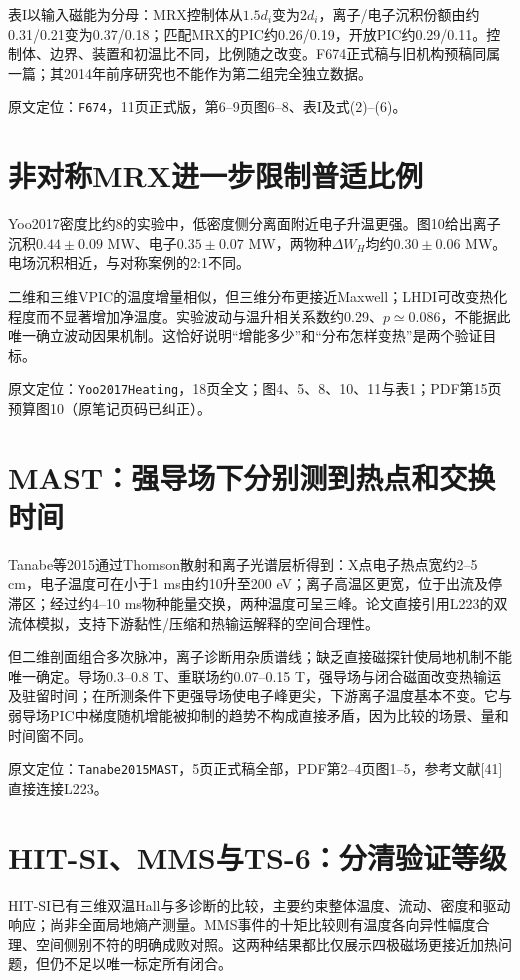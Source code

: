 \documentclass[UTF8,a4paper,11pt,openany,fontset=fandol]{ctexbook}
\newcommand{\loc}[2]{\par\noindent\textsf{原文定位：}\texttt{#1}，#2。\par}
\begin{document}
表I以输入磁能为分母：MRX控制体从$1.5d_i$变为$2d_i$，离子/电子沉积份额由约0.31/0.21变为0.37/0.18；匹配MRX的PIC约0.26/0.19，开放PIC约0.29/0.11。控制体、边界、装置和初温比不同，比例随之改变。F674正式稿与旧机构预稿同属一篇；其2014年前序研究也不能作为第二组完全独立数据。
\loc{F674}{11页正式版，第6--9页图6--8、表I及式(2)--(6)}

\section{非对称MRX进一步限制普适比例}
Yoo2017密度比约8的实验中，低密度侧分离面附近电子升温更强。图10给出离子沉积$0.44\pm0.09$ MW、电子$0.35\pm0.07$ MW，两物种$\Delta W_H$均约$0.30\pm0.06$ MW。电场沉积相近，与对称案例的2:1不同。\citep{Yoo2017Heating}

二维和三维VPIC的温度增量相似，但三维分布更接近Maxwell；LHDI可改变热化程度而不显著增加净温度。实验波动与温升相关系数约0.29、$p\simeq0.086$，不能据此唯一确立波动因果机制。这恰好说明“增能多少”和“分布怎样变热”是两个验证目标。
\loc{Yoo2017Heating}{18页全文；图4、5、8、10、11与表1；PDF第15页预算图10（原笔记页码已纠正）}

\section{MAST：强导场下分别测到热点和交换时间}
Tanabe等2015通过Thomson散射和离子光谱层析得到：X点电子热点宽约2--5 cm，电子温度可在小于1 ms由约10升至200 eV；离子高温区更宽，位于出流及停滞区；经过约4--10 ms物种能量交换，两种温度可呈三峰。论文直接引用L223的双流体模拟，支持下游黏性/压缩和热输运解释的空间合理性。\citep{Tanabe2015MAST,L223}

但二维剖面组合多次脉冲，离子诊断用杂质谱线；缺乏直接磁探针使局地机制不能唯一确定。导场0.3--0.8 T、重联场约0.07--0.15 T，强导场与闭合磁面改变热输运及驻留时间；在所测条件下更强导场使电子峰更尖，下游离子温度基本不变。它与弱导场PIC中梯度随机增能被抑制的趋势不构成直接矛盾，因为比较的场景、量和时间窗不同。
\loc{Tanabe2015MAST}{5页正式稿全部，PDF第2--4页图1--5，参考文献[41]直接连接L223}

\section{HIT-SI、MMS与TS-6：分清验证等级}
HIT-SI已有三维双温Hall与多诊断的比较，主要约束整体温度、流动、密度和驱动响应；尚非全面局地熵产测量。MMS事件的十矩比较则有温度各向异性幅度合理、空间侧别不符的明确成败对照。这两种结果都比仅展示四极磁场更接近加热问题，但仍不足以唯一标定所有闭合。\citep{Kaptanoglu2020,TenBarge2019MMS}
\end{document}
